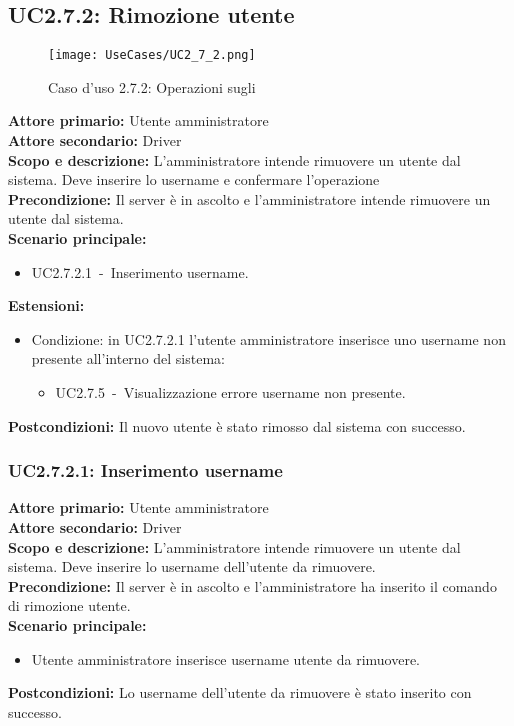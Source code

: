 \documentclass{scalatekids-article}
\begin{document}
\subsection{UC2.7.2: Rimozione utente}

\begin{figure}[H]
  \begin{center}
    \texttt{[image: UseCases/UC2\_7\_2.png]}
    \caption*{Caso d'uso 2.7.2: Operazioni sugli }
  \end{center}
\end{figure}
\textbf{Attore primario:} Utente amministratore\\
\textbf{Attore secondario:} Driver\\
\textbf{Scopo e descrizione:} L'amministratore intende rimuovere un utente dal sistema. Deve inserire lo username e confermare l'operazione\\
\textbf{Precondizione:} Il server è in ascolto e l'amministratore intende rimuovere un utente dal sistema.\\
\textbf{Scenario principale:}
\begin{itemize}
\item UC2.7.2.1\ -\ Inserimento username.
\end{itemize}
\textbf{Estensioni:}
\begin{itemize}
\item Condizione: in UC2.7.2.1 l'utente amministratore inserisce uno username non presente all'interno del sistema:
  \begin{itemize}
  \item UC2.7.5\ -\ Visualizzazione errore username non presente.
  \end{itemize}
\end{itemize}
\textbf{Postcondizioni:} Il nuovo utente è stato rimosso dal sistema con successo.

\subsubsection{UC2.7.2.1: Inserimento username}

\textbf{Attore primario:} Utente amministratore\\
\textbf{Attore secondario:} Driver\\
\textbf{Scopo e descrizione:} L'amministratore intende rimuovere un utente dal sistema. Deve inserire lo username dell'utente da rimuovere.\\
\textbf{Precondizione:} Il server è in ascolto e l'amministratore ha inserito il comando di rimozione utente.\\
\textbf{Scenario principale:}
\begin{itemize}
\item Utente amministratore inserisce username utente da rimuovere.
\end{itemize}
\textbf{Postcondizioni:} Lo username dell'utente da rimuovere è stato inserito con successo.
\end{document}
